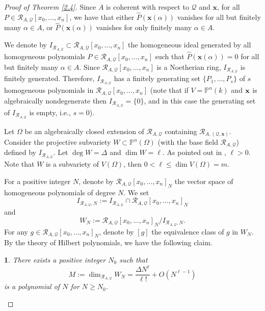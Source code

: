 \documentclass[12pt,leqno]{amsart}
\newtheorem{claim}[equation]{\indent{\it Claim}\rm }
\numberwithin{equation}{section}
\begin{document}
\begin{proof}[Proof of Theorem \ref{2.4}]
Since $A$ is coherent with respect to $\mathcal{Q}$ and $\mathbf{x}$, for all $P \in \mathcal{R}_{A, \mathcal{Q}}\left[x_0, \ldots, x_n\right]$, we have that either $\widehat{P}(\mathbf{x}(\alpha))$ vanishes for all but finitely many $\alpha \in A$, or $\widehat{P}(\mathbf{x}(\alpha))$ vanishes for only finitely many $\alpha \in A$.

We denote by $I_{\mathcal{R}_{A, \mathcal{Q}}} \subset \mathcal{R}_{A, \mathcal{Q}}\left[x_0, \ldots, x_n\right]$ the homogeneous ideal generated by all homogeneous polynomials $P \in \mathcal{R}_{A, \mathcal{Q}}\left[x_0, \ldots, x_n\right]$ such that $\widehat{P}(\mathbf{x}(\alpha))=0$ for all but finitely many $\alpha \in A$. 
Since $\mathcal{R}_{A, \mathcal{Q}}\left[x_0, \ldots, x_n\right]$ is a Noetherian ring, $I_{\mathcal{R}_{A, \mathcal{Q}}}$ is finitely generated. Therefore, $I_{\mathcal{R}_{A, \mathcal{Q}}}$ has a finitely generating set $\{P_{1}, \ldots, P_{s}\}$ of $s$ homogeneous polynomials in $\mathcal{R}_{A, \mathcal{Q}}\left[x_0, \ldots, x_n\right]$ (note that if $V=\mathbb P^n(k)$ and ${\bf x}$ is algebraically nondegenerate then $I_{\mathcal{R}_{A, \mathcal{Q}}}=\{0\}$, and in this case the generating set of $I_{\mathcal{R}_{A, \mathcal{Q}}}$ is empty, i.e., $s=0$).

Let $\Omega$ be an algebraically closed extension of $\mathcal{R}_{A, \mathcal{Q}}$ containing $\mathcal{R}_{A,(\mathcal{Q}, \mathbf{x})}$. 
Consider the projective subvariety $W\subset \mathbb{P}^{n}(\Omega)$ (with the base field $\mathcal{R}_{A, \mathcal{Q}}$) defined by $I_{\mathcal{R}_{A, \mathcal{Q}}}$. Let $\deg W=\Delta$ and $\dim W=\ell$. As pointed out in \cite{JYY}, $\ell>0$. Note that $W$ is a subvariety of $V(\Omega)$, then $0<\ell \leqslant \dim V(\Omega)= m$. 

For a positive integer $N$, denote by $\mathcal{R}_{A, \mathcal{Q}}\left[x_0, \ldots, x_n\right]_{N}$ the vector space of homogeneous polynomials of degree $N$. We set 
$$I_{\mathcal{R}_{A, \mathcal{Q}}, N}:=I_{\mathcal{R}_{A, \mathcal{Q}}} \cap \mathcal{R}_{A, \mathcal{Q}}\left[x_0, \ldots, x_n\right]_{N}$$
and 
$$W_{N}:=\mathcal{R}_{A, \mathcal{Q}}\left[x_0, \ldots, x_n\right]_{N} / I_{\mathcal{R}_{A, \mathcal{Q}}, N}.$$
For any $g \in \mathcal{R}_{A, \mathcal{Q}}\left[x_0, \ldots, x_n\right]_{N}$, denote by $[g]$ the equivalence class of $g$ in $W_{N}$. By the theory of Hilbert polynomials, we have the following claim.
\begin{claim}\label{2.6}
There exists a positive integer $N_{0}$ such that
$$M:=\operatorname{dim}_{\mathcal{R}_{A, \mathcal{Q}}} W_{N}=\frac{\Delta N^{\ell}}{\ell!}+O\left(N^{\ell-1}\right)$$
is a polynomial of $N$ for $N \geqslant N_{0}$.
\end{claim}


\end{proof}
\end{document}
